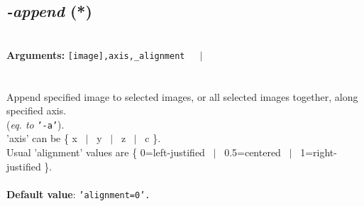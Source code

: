 \documentclass[a4paper,11pt,twoside]{book}
\begin{document}
\subsection{\emph{-append} (*)}\vspace*{-0.5em}
~\\\textbf{Arguments: } 
{\small \texttt{[image],axis,\_alignment}}~~~$|$\\
\\~\\
Append specified image to selected images, or all selected images together, along specified axis.
~\\(\emph{eq. to} {\small \texttt{'-a'}}).
~\\'axis' can be \{ x ~$|$~ y ~$|$~ z ~$|$~ c \}.
~\\Usual 'alignment' values are \{ 0=left-justified ~$|$~ 0.5=centered ~$|$~ 1=right-justified \}.
~\\~\\\textbf{Default value}: {\small \texttt{'alignment=0'.}}
\end{document}
